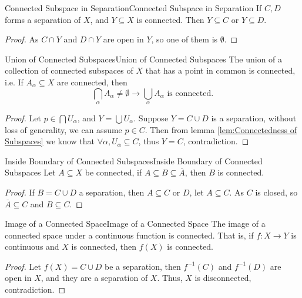 \documentclass[../main.tex]{subfiles}
\begin{document}
\begin{lemma}{Connected Subspace in Separation}{Connected Subspace in Separation}
If $C,D$ forms a separation of $X$, and $Y \subseteq X$ is connected. Then $Y \subseteq C$ or $Y \subseteq D$.
\end{lemma}
\begin{proof}
As $C\cap Y$ and $D\cap Y$ are open in $Y$, so one of them is $\emptyset $.
\end{proof}

\begin{theorem}{Union of Connected Subspaces}{Union of Connected Subspaces}
The union of a collection of connected subspaces of $X$ that has a point in common is connected, i.e. If $A_{\alpha}\subseteq X$ are connected, then
\begin{equation*}
	\bigcap_{\alpha} A_{\alpha} \neq \emptyset \rightarrow \bigcup_{\alpha} A_{\alpha} \text{ is connected.}
\end{equation*}
\end{theorem}
\begin{proof}
	Let $p\in \bigcap U_{\alpha}$, and $Y = \bigcup U_{\alpha}$. Suppose $Y = C \cup D$ is a separation, without loss of generality, we can assume $p\in C$. Then from lemma \ref{lem:Connectedness of Subspaces} we know that $\forall \alpha, U_{\alpha} \subseteq C$, thus $Y = C$, contradiction.
\end{proof}

\begin{theorem}{Inside Boundary of Connected Subspaces}{Inside Boundary of Connected Subspaces}
Let $A \subseteq X$ be connected, if $A \subseteq B \subseteq \overline{A}$, then $B$ is connected.
\end{theorem}
\begin{proof}
If $B = C\cup D$ a separation, then $A \subseteq C$ or $D$, let $A \subseteq C$. As $C$ is closed, so $\overline{A} \subseteq C$ and $B \subseteq C$.
\end{proof}

\begin{theorem}{Image of a Connected Space}{Image of a Connected Space}
The image of a connected space under a continuous function is connected. That is, if $f: X \rightarrow Y$ is continuous and $X$ is connected, then $f(X)$ is connected.
\end{theorem}
\begin{proof}
	Let $f(X) = C \cup D$ be a separation, then $f^{-1}(C)$ and $f^{-1}(D)$ are open in $X$, and they are a separation of $X$. Thus, $X$ is disconnected, contradiction.
\end{proof}
\end{document}

